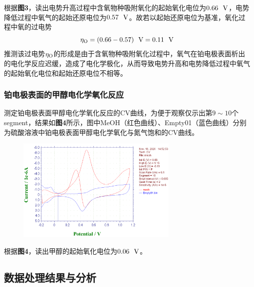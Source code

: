 \documentclass[12pt]{article}
\begin{document}
\par
根据\textbf{图3}，读出电势升高过程中含氧物种吸附氧化的起始氧化电位为$0.66\ \ {\rm V}$，电势降低过程中氧气的起始还原电位为$0.57\ \ {\rm V}$。故若以起始还原电位为基准，氧化过程中氧的过电势
$$
\eta_{\rm O}=(0.66-0.57)\ \ {\rm V}=0.11\ \ {\rm V}
$$
推测该过电势$\eta_{\rm O}$的形成是由于含氧物种吸附氧化过程中，氧气在铂电极表面析出的电化学反应迟缓，造成了电化学极化，从而导致电势升高和电势降低过程中氧气的起始氧化电位和起始还原电位不相等。
\subsubsection{铂电极表面的甲醇电化学氧化反应}
测定铂电极表面甲醇电化学氧化反应的CV曲线，为便于观察仅示出第$9\sim 10$个segment，结果如\textbf{图4}所示，图中MeOH（红色曲线）、Empty01（蓝色曲线）分别为硫酸溶液中铂电极表面甲醇电化学氧化与氮气饱和的CV曲线。
\begin{figure}[h]
	\centering
	\includegraphics[width=0.7\textwidth]{4.bmp}
\end{figure}
\par
根据\textbf{图4}，读出甲醇的起始氧化电位为$0.06\ \ {\rm V}$。

 \subsection{数据处理结果与分析}
\end{document}
